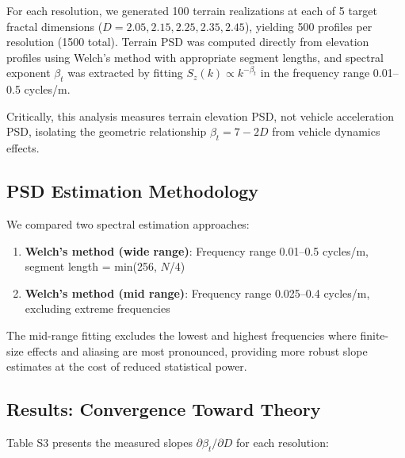 \documentclass[11pt]{article}
\begin{document}
For each resolution, we generated 100 terrain realizations at each of 5 target fractal dimensions ($D = 2.05, 2.15, 2.25, 2.35, 2.45$), yielding 500 profiles per resolution (1500 total). Terrain PSD was computed directly from elevation profiles using Welch's method with appropriate segment lengths, and spectral exponent $\beta_t$ was extracted by fitting $S_z(k) \propto k^{-\beta_t}$ in the frequency range 0.01--0.5 cycles/m.

Critically, this analysis measures terrain elevation PSD, not vehicle acceleration PSD, isolating the geometric relationship $\beta_t = 7-2D$ from vehicle dynamics effects.

\subsection{PSD Estimation Methodology}

We compared two spectral estimation approaches:
\begin{enumerate}
\item \textbf{Welch's method (wide range)}: Frequency range 0.01--0.5 cycles/m, segment length = min(256, $N$/4)
\item \textbf{Welch's method (mid range)}: Frequency range 0.025--0.4 cycles/m, excluding extreme frequencies
\end{enumerate}

The mid-range fitting excludes the lowest and highest frequencies where finite-size effects and aliasing are most pronounced, providing more robust slope estimates at the cost of reduced statistical power.

\subsection{Results: Convergence Toward Theory}

Table S3 presents the measured slopes $\partial \beta_t / \partial D$ for each resolution:
\end{document}
